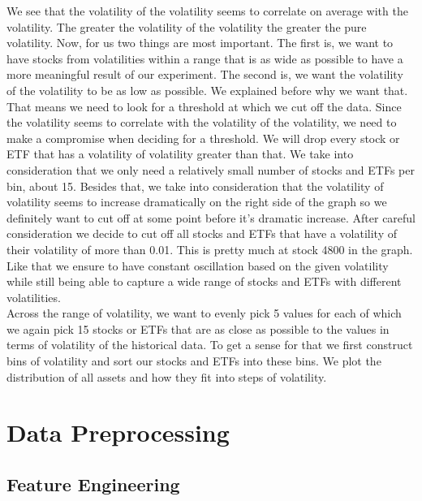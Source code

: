 \documentclass[a4paper,12pt]{report}
\begin{document}
	We see that the volatility of the volatility seems to correlate on average with the volatility. The greater the volatility of the volatility the greater the pure volatility. Now, for us two things are most important. The first is, we want to have stocks from volatilities within a range that is as wide as possible to have a more meaningful result of our experiment. The second is, we want the volatility of the volatility to be as low as possible. We explained before why we want that. That means we need to look for a threshold at which we cut off the data. Since the volatility seems to correlate with the volatility of the volatility, we need to make a compromise when deciding for a threshold. We will drop every stock or ETF that has a volatility of volatility greater than that. We take into consideration that we only need a relatively small number of stocks and ETFs per bin, about 15. Besides that, we take into consideration that the volatility of volatility seems to increase dramatically on the right side of the graph so we definitely want to cut off at some point before it’s dramatic increase. After careful consideration we decide to cut off all stocks and ETFs that have a volatility of their volatility of more than 0.01. This is pretty much at stock 4800 in the graph. Like that we ensure to have constant oscillation based on the given volatility while still being able to capture a wide range of stocks and ETFs with different volatilities. \\
	Across the range of volatility, we want to evenly pick 5 values for each of which we again pick 15 stocks or ETFs that are as close as possible to the values in terms of volatility of the historical data. To get a sense for that we first construct bins of volatility and sort our stocks and ETFs into these bins. We plot the distribution of all assets and how they fit into steps of volatility.\\
		
	
	
	
	
	
	
	
	
	
	
	
	
	
	
	
	\section{Data Preprocessing}

		\subsection{Feature Engineering}
\end{document}
